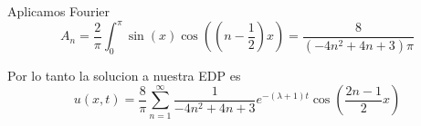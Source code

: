 \message{ !name(MAT024.tex)}\documentclass[../main.tex]{subfiles}
\begin{document}
\begin{solution}
  Aplicamos Fourier
  \begin{equation*}
    A_{n} = \frac{2}{\pi} \int_{0}^{\pi} \sin(x) \cos((n - \frac12)x) = \frac{8}{(-4n^{2} + 4n + 3) \pi}
  \end{equation*}

  Por lo tanto la solucion a nuestra EDP es
  \begin{equation*}
    u(x, t) = \frac{8}{\pi} \sum_{n = 1}^{\infty} \frac{1}{-4n^{2} + 4n + 3} e^{-(\lambda + 1)t} \cos(\frac{2n - 1}{2}x)
  \end{equation*}
\end{solution}
\end{document}
